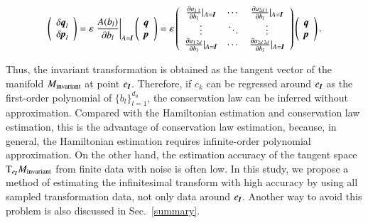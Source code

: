 \documentclass[preprint,
bibnotes,
 amsmath,amssymb,
 aps,
]{revtex4-1}
\begin{document}
\begin{equation}
\label{infest}
\left(
\begin{array}{c}
 \delta {\textit{\textbf{q}}}_l\\ \delta {\textit{\textbf{p}}}_l
\end{array}
\right)
 = \varepsilon \left.\frac{A(b_l)}{\partial b_l}\right|_{A=\textit{\textbf{I}}}
 \left(
\begin{array}{c}
  {\textit{\textbf{q}}}\\  {\textit{\textbf{p}}}
\end{array}
\right)
 = \varepsilon \left(
    \begin{array}{ccc}
      \frac{\partial a_{1\:1}}{\partial b_l}|_{A=\textit{\textbf{I}}} & \cdots & \frac{\partial a_{2d\:1}}{\partial b_l}|_{A=\textit{\textbf{I}}}\\
      \vdots & \ddots & \vdots \\
      \frac{\partial a_{1\:2d}}{\partial b_l}|_{A=\textit{\textbf{I}}} & \cdots & \frac{\partial a_{2d\:2d}}{\partial b_l}|_{A=\textit{\textbf{I}}}\\
    \end{array}
  \right) 
 \left(
\begin{array}{c}
  {\textit{\textbf{q}}}\\  {\textit{\textbf{p}}}
\end{array}
\right).
\end{equation} 

\par
Thus, the invariant transformation is obtained as the tangent vector of the manifold $M_{{\rm invariant}}$ at point $e_{\textit{\textbf{I}}}$. 
Therefore, if $c_k$ can be regressed around $e_{\textit{\textbf{I}}}$ as the first-order polynomial of $\{b_l\}_{l=1}^{d_{\theta}}$, the conservation law can be inferred without approximation. 
Compared with the Hamiltonian estimation and conservation law estimation, this is the advantage of conservation law estimation, because, in general, the Hamiltonian estimation requires infinite-order polynomial approximation. 
On the other hand, the estimation accuracy of the tangent space ${\rm T}_{e_{\textit{\textbf{I}}}} M_{{\rm invariant}}$ from finite data with noise is often low. 
In this study, we propose a method of estimating the infinitesimal transform with high accuracy by using all sampled transformation data, not only data around $e_{\textit{\textbf{I}}}$. 
Another way to avoid this problem is also discussed in Sec.~\ref{summary}.\par
\end{document}
